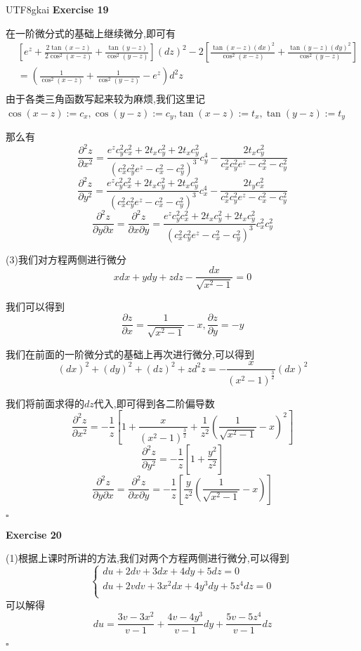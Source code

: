 \documentclass{article}
\newenvironment{exercise}[1]{%
{\textbf{Exercise #1} \\ 
    }
}{
  \hfill $\square$ 
  \par\bigskip 
}
\newcommand{\parameter}[1]{\left(#1\right)}
\newcommand{\bracket}[1]{\left[#1\right]}
\begin{document}
\begin{CJK}{UTF8}{gkai}
\begin{exercise}{19}
    在一阶微分式的基础上继续微分,即可有
    \[
    \begin{aligned}
        &\bracket{e^z + \frac{2\tan(x - z)}{2\cos^2(x - z)} + \frac{\tan(y - z)}{\cos^2(y - z)}}(dz)^2-2\bracket{\frac{\tan(x - z)(dx)^2}{\cos^2(x - z)} + \frac{\tan(y - z)(dy)^2}{\cos^2(y - z)}} \\
        &= \parameter{ \frac{1}{\cos^2(x - z)} + \frac{1}{\cos^2(y - z)} - e^z} d^2 z\\
    \end{aligned}    
    \]
    由于各类三角函数写起来较为麻烦,我们这里记$\cos(x - z) := c_x,\cos(y - z) := c_y$,$\tan(x - z) := t_x,\tan(y - z) := t_y$

    那么有
    \[\frac{\partial^2 z}{\partial x^2} = \frac{e^z c_y^2 c_x^2 + 2t_x c_y^2 + 2t_x c_y^2}{(c_x^2 c_y^2 e^z - c_x^2 - c_y^2)^3}c_y^4 - \frac{2t_x c_y^2}{c_x^2 c_y^2 e^z - c_x^2 - c_y^2}\]
    \[\frac{\partial^2 z}{\partial y^2} = \frac{e^z c_y^2 c_x^2 + 2t_x c_y^2 + 2t_x c_y^2}{(c_x^2 c_y^2 e^z - c_x^2 - c_y^2)^3}c_x^4 - \frac{2t_y c_x^2}{c_x^2 c_y^2 e^z - c_x^2 - c_y^2}\]
    \[\frac{\partial^2 z}{\partial y\partial x} = \frac{\partial^2 z}{\partial x\partial y} = \frac{e^z c_y^2 c_x^2 + 2t_x c_y^2 + 2t_x c_y^2}{(c_x^2 c_y^2 e^z - c_x^2 - c_y^2)^3}c_x^2 c_y^2\]
    
    (3)我们对方程两侧进行微分
    \[xdx + y dy + zdz - \frac{dx}{\sqrt{x^2 - 1}} = 0\]

    我们可以得到
    \[\frac{\partial z}{\partial x} = \frac{1}{\sqrt{x^2 - 1}} - x, \frac{\partial z}{\partial y} = -y\]

    我们在前面的一阶微分式的基础上再次进行微分,可以得到
    \[(dx)^2 + (dy)^2 + (dz)^2 + z d^2 z = -\frac{x}{(x^2 - 1)^{\frac{3}{2}}}(dx)^2\]

    我们将前面求得的$dz$代入,即可得到各二阶偏导数
    \[\frac{\partial^2 z}{\partial x^2} = - \frac{1}{z} \bracket{1 + \frac{x}{(x^2 - 1)^{\frac{3}{2}}} + \frac{1}{z^2}\parameter{\frac{1}{\sqrt{x^2 - 1}} - x}^2}\]
    \[\frac{\partial^2 z}{\partial y^2} = - \frac{1}{z} \bracket{1 + \frac{y^2}{z^2}}\]
    \[\frac{\partial^2 z}{\partial y \partial x} = \frac{\partial^2 z}{\partial x \partial y} = - \frac{1}{z} \bracket{\frac{y}{z^2}\parameter{\frac{1}{\sqrt{x^2 - 1}} - x}}\]
\end{exercise}




\begin{exercise}{20}
    (1)根据上课时所讲的方法,我们对两个方程两侧进行微分,可以得到
    \[\begin{cases}
        du + 2 dv + 3 dx + 4 dy + 5 dz = 0\\
        du + 2v dv + 3x^2 dx + 4y^3 dy + 5z^4 dz = 0\\
    \end{cases}\]
    可以解得
    \[du = \frac{3v - 3 x^2}{v - 1} + \frac{4 v - 4 y^3}{v - 1}dy + \frac{5v - 5z^4}{v - 1}dz\]


\end{exercise}
\end{CJK}
\end{document}
